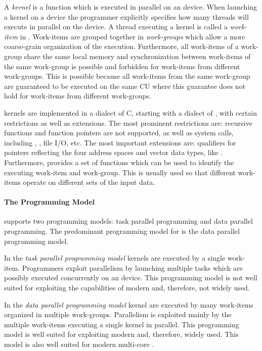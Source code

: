 A \OpenCL \emph{kernel} is a function which is executed in parallel on an \OpenCL device.
When launching a kernel on a device the programmer explicitly specifies how many threads will execute in parallel on the device.
A thread executing a kernel is called a \emph{work-item} in \OpenCL.
Work-items are grouped together in \emph{work-groups} which allow a more coarse-grain organization of the execution.
Furthermore, all work-items of a work-group share the same local memory and synchronization between work-items of the same work-group is possible and forbidden for work-items from different work-groups.
This is possible because all work-items from the same work-group are guaranteed to be executed on the same CU where this guarantee does not hold for work-items from different work-groups.

\OpenCL kernels are implemented in a dialect of C, starting with  a dialect of \Cpp, with certain restrictions as well as extensions.
The most prominent restrictions are:
recursive functions and function pointers are not supported, as well as system calls, including , , file I/O, etc.
The most important extensions are:
qualifiers for pointers reflecting the four address spaces and vector data types, like .
Furthermore, \OpenCL provides a set of functions which can be used to identify the executing work-item and work-group.
This is usually used so that different work-items operate on different sets of the input data.

\paragraph{The \OpenCL Programming Model}

\OpenCL supports two programming models: task parallel programming and data parallel programming.
The predominant programming model for \OpenCL is the data parallel programming model.

In the \emph{task parallel programming model} kernels are executed by a single work-item.
Programmers exploit parallelism by launching multiple tasks which are possibly executed concurrently on an \OpenCL device.
This programming model is not well suited for exploiting the capabilities of modern \GPUs and, therefore, not widely used.

In the \emph{data parallel programming model} kernel are executed by many work-items organized in multiple work-groups.
Parallelism is exploited mainly by the multiple work-items executing a single kernel in parallel.
This programming model is well suited for exploiting modern \GPUs and, therefore, widely used.
This model is also well suited for modern multi-core \CPUs.

